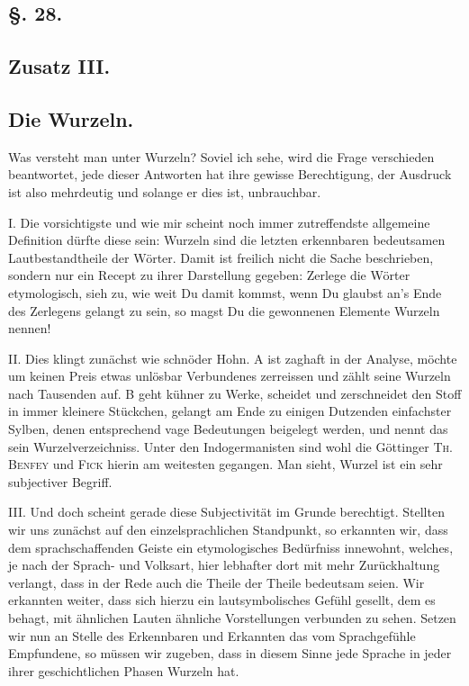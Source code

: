 {\label{sp.295}

\subsection*{§. 28.}\label{III.II.II.28}
\subsection*{Zusatz III.}
\subsection*{Die Wurzeln.}
Was versteht man unter Wurzeln? Soviel ich sehe, wird die Frage verschieden beantwortet, jede dieser Antworten hat ihre gewisse Berechtigung, der Ausdruck ist also mehrdeutig und solange er dies ist, unbrauchbar.

I. Die vorsichtigste und wie mir scheint noch immer zutreffendste allgemeine Definition dürfte diese sein: Wurzeln sind die letzten erkennbaren bedeutsamen Lautbestandtheile der Wörter. Damit ist freilich nicht die Sache beschrieben, sondern nur ein Recept zu ihrer Darstellung gegeben: Zerlege die Wörter etymologisch, sieh zu, wie weit Du damit kommst,  wenn Du glaubst an’s Ende des Zerlegens gelangt zu sein, so magst Du die gewonnenen Elemente Wurzeln nennen!

II. Dies klingt zunächst wie schnöder Hohn. A ist zaghaft in der Analyse, möchte um keinen Preis etwas unlösbar Verbundenes zerreissen und zählt seine Wurzeln nach Tausenden auf. B geht kühner zu Werke, scheidet und zerschneidet den Stoff in immer kleinere Stückchen, gelangt am Ende zu einigen Dutzenden einfachster Sylben, denen entsprechend vage Bedeutungen beigelegt werden, und nennt das sein Wurzelverzeichniss. Unter den Indogermanisten sind wohl die Göttinger \textsc{Th. Benfey} und \textsc{Fick} hierin am weitesten gegangen. Man sieht, Wurzel ist ein sehr subjectiver Begriff.

III. Und doch scheint gerade diese Subjectivität im Grunde berechtigt. Stellten wir uns zunächst auf den einzelsprachlichen Standpunkt, so erkannten wir, dass dem sprachschaffenden Geiste ein etymologisches Bedürfniss innewohnt, welches, je nach der Sprach- und Volksart, hier lebhafter dort mit mehr Zurückhaltung verlangt, dass in der Rede auch die Theile der Theile bedeutsam seien. Wir erkannten weiter, dass sich hierzu ein lautsymbolisches Gefühl gesellt, dem es behagt, mit ähnlichen Lauten ähnliche Vorstellungen verbunden zu sehen. Setzen wir nun an Stelle des Erkennbaren und Erkannten das vom Sprachgefühle Empfundene, \label{fp.290} so müssen wir zugeben, dass in diesem Sinne jede Sprache in jeder ihrer geschichtlichen Phasen Wurzeln hat.

}
